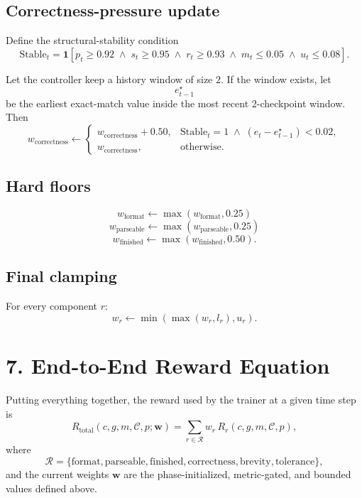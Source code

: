 \documentclass[11pt]{article}
\newcommand{\ind}{\mathbf{1}}
\begin{document}
\subsection*{Correctness-pressure update}
Define the structural-stability condition
\[
\mathrm{Stable}_t
=
\ind\!\left[
p_t \ge 0.92
\;\wedge\;
s_t \ge 0.95
\;\wedge\;
r_t \ge 0.93
\;\wedge\;
m_t \le 0.05
\;\wedge\;
u_t \le 0.08
\right].
\]

Let the controller keep a history window of size $2$. If the window exists, let
\[
e_{t-1}^{\star}
\]
be the earliest exact-match value inside the most recent 2-checkpoint window. Then
\[
w_{\mathrm{correctness}}
\leftarrow
\begin{cases}
w_{\mathrm{correctness}} + 0.50,
& \mathrm{Stable}_t = 1
\;\wedge\;
(e_t - e_{t-1}^{\star}) < 0.02, \\
w_{\mathrm{correctness}}, & \text{otherwise.}
\end{cases}
\]

\subsection*{Hard floors}
\[
w_{\mathrm{format}} \leftarrow \max(w_{\mathrm{format}}, 0.25)
\]
\[
w_{\mathrm{parseable}} \leftarrow \max(w_{\mathrm{parseable}}, 0.25)
\]
\[
w_{\mathrm{finished}} \leftarrow \max(w_{\mathrm{finished}}, 0.50).
\]

\subsection*{Final clamping}
For every component $r$:
\[
w_r \leftarrow \min(\max(w_r, l_r), u_r).
\]

\section*{7. End-to-End Reward Equation}
Putting everything together, the reward used by the trainer at a given time step is
\[
R_{\mathrm{total}}(c,g,m,\mathcal{C},p;\mathbf{w})
=
\sum_{r \in \mathcal{R}} w_r \, R_r(c,g,m,\mathcal{C},p),
\]
where
\[
\mathcal{R}
=
\{
\mathrm{format},
\mathrm{parseable},
\mathrm{finished},
\mathrm{correctness},
\mathrm{brevity},
\mathrm{tolerance}
\},
\]
and the current weights $\mathbf{w}$ are the phase-initialized, metric-gated, and bounded values defined above.
\end{document}
